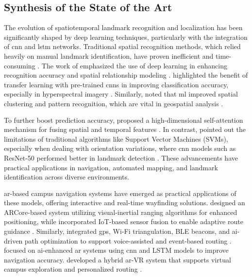 \begin{refsection}
\section{Synthesis of the State of the Art}

The evolution of spatiotemporal landmark recognition and localization has been significantly shaped by deep learning techniques, particularly with the integration of \gls{cnn} and \gls{lstm} networks. Traditional spatial recognition methods, which relied heavily on manual landmark identification, have proven inefficient and time-consuming \cite{three}. The work of \citeauthor{three} \citeyear{three} emphasized the use of deep learning in enhancing recognition accuracy and spatial relationship modeling \cite{three}. \citeauthor{six} \citeyear{six} highlighted the benefit of transfer learning with pre-trained \gls{cnn}s in improving classification accuracy, especially in hyperspectral imagery \cite{six}. Similarly, \citeauthor{seven} \citeyear{seven} noted that \gls{ml} improved spatial clustering and pattern recognition, which are vital in geospatial analysis \cite{seven}.

To further boost prediction accuracy, \citeauthor{eight} \citeyear{eight} proposed a high-dimensional self-attention mechanism for fusing spatial and temporal features \cite{eight}. In contrast, \citeauthor{nine}\citeyear{nine} pointed out the limitations of traditional algorithms like Support Vector Machines (SVMs), especially when dealing with orientation variations, where \gls{cnn} models such as ResNet-50 performed better in landmark detection \cite{nine}. These advancements have practical applications in navigation, automated mapping, and landmark identification across diverse environments.

\gls{ar}-based campus navigation systems have emerged as practical applications of these models, offering interactive and real-time wayfinding solutions. \citeauthor{one} \citeyear{one} designed an ARCore-based system utilizing visual-inertial ranging algorithms for enhanced positioning, while \citeauthor{ten} \citeyear{ten} incorporated IoT-based sensor fusion to enable adaptive route guidance \cite{one, ten}. Similarly, \citeauthor{two} \citeyear{two} integrated \gls{gps}, Wi-Fi triangulation, BLE beacons, and \gls{ai}-driven path optimization to support voice-assisted and event-based routing \cite{two}. \citeauthor{thirteens} \citeyear{thirteens} focused on \gls{ai}-enhanced \gls{ar} systems using \gls{cnn} and LSTM models to improve navigation accuracy. \citeauthor{four} \citeyear{four} developed a hybrid \gls{ar}-VR system that supports virtual campus exploration and personalized routing \cite{thirteens, four}.


\end{refsection}
